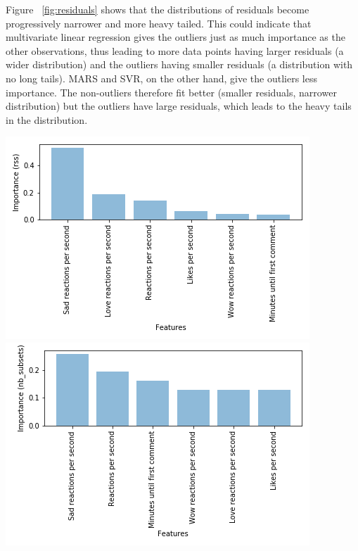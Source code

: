 \documentclass[twoside]{article}
\begin{document}
\clearpage
\begin{multicols}{2}
Figure ~\ref{fig:residuals} shows that the distributions of residuals become progressively narrower and more heavy tailed. This could indicate that multivariate linear regression gives the outliers just as much importance as the other observations, thus leading to more data points having larger residuals (a wider distribution) and the outliers having smaller residuals (a distribution with no long tails). MARS and SVR, on the other hand, give the outliers less importance. The non-outliers therefore fit better (smaller residuals, narrower distribution) but the outliers have large residuals, which leads to the heavy tails in the distribution.
\end{multicols}
\begingroup
\centering
\includegraphics[scale=0.7]{images/mars_imp_rss}
\includegraphics[scale=0.7]{mars_imp_nb_subsets}
\label{fig:marsimportances}
\endgroup
\end{document}
